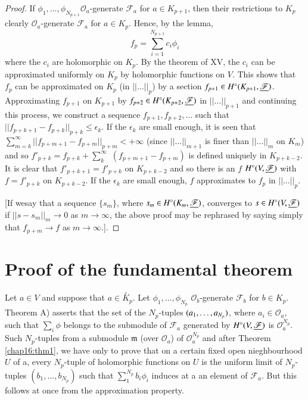 \begin{proof}
If $\phi_1, \ldots, \phi_{N_{p+1}} \mathscr{O}_a$-generate
$\mathscr{F}_a$ for $a \in K_{p+1}$, then their restrictions to $K_p$
clearly $\mathscr{O}_a$-generate $\mathscr{F}_a$ for $a \in
K_p$. Hence, by the lemma,
$$
f_p = \sum\limits^{N_{p+1}}_{i=1} c_i \phi_i
$$
where the $c_i$ are holomorphic on $K_p$. By the theorem of XV, the
$c_i$ can be approximated uniformly on $K_p$ by holomorphic functions
on $V$. This shows that $f_p$ can be approximated on $K_p$ (in $||
\ldots ||_p$) by a section $f_{p+1} \in H^\circ (K_{p+1},
\underline{\mathscr{F}})$. Approximating $f_{p+1}$ on $K_{p+1}$ by $f_{p+2}
\in H^\circ (K_{p+2}, \underline{\mathscr{F}})$ in $||\ldots ||_{p+1}$ and
continuing this process, we construct a sequence $f_{p+1}, f_{p+2},
\ldots$ such that $||f_{p+k+1} - f_{p+k}||_{p+k} \leq \epsilon_k$. If the
$\epsilon_k$ are small enough, it is seen that
$\sum\limits^\infty_{m=k}||f_{p+m+1} - f_{p+m}||_{p+m} < + \infty$
(since $||\ldots ||_{m+1}$ is finer than $||\ldots ||_m$ on $K_m$) and
so $f'_{p+k} = f_{p+k} + \sum\limits^\infty_{k}$ $(f_{p+m+1} -
f_{p+m})$ is defined uniquely in $K_{p+k-2}$. It is clear that
$f'_{p+k+1} = f'_{p+k}$ on $K_{p+k-2}$ and so there is an $f$ $H^\circ
(V, \underline{\mathscr{F}})$ with $f = f'_{p+k}$ on $K_{p+k-2}$. If the
$\epsilon_k$ are small enough, $f$ approximates to $f_p$ in $|| \ldots
||_p$. 

[If we\pageoriginale say that a sequence $\{s_m\}$, where $s_m \in
  H^\circ (K_m, \underline{\mathscr{F}})$, converges to $s \in H^\circ (
V, \underline{\mathscr{F}})$ if $|| s- s_m||_m \to 0$ as $m \to \infty$, the
above proof may be rephrased by saying simply that $f_{p+m} \to f$ as
$m \to \infty$.].
\end{proof}

\section{Proof of the fundamental theorem}\label{chap16:sec3}

\medskip
{}

Let $a \in V$ and suppose that $a \in \overset{\circ}{K}_p$. Let
$\phi_1, \ldots , \phi_{N_p}$ $\mathscr{O}_b$-generate $\mathscr{F}_b$
for $b \in K_p$. Theorem A) asserts that the set of the $N_p$-tuples
$(a_1, \ldots,\break a_{N_p})$, where $a_i \in \mathscr{O}_a$, such that
$\sum_i \phi$ belongs to the submodule of $\mathscr{F}_a$ generated
by $H^\circ (V, \underline{\mathscr{F}})$ is $\mathscr{O}^{N_p}_a$. Such
$N_p$-tuples from a submodule $\mathfrak{m}$ (over $\mathscr{O}_a$) of
$\mathscr{O}^{N_p}_a$ and after Theorem \ref{chap16:thm1}, we have
only to prove that 
on a certain fixed open nieghbourhood $U$ of a, every $N_p$-tuple of
holomorphic functions on $U$ is the uniform limit of $N_p$-tuples
$(b_1, \ldots, b_{N_p})$ such that $\sum\limits^{N_p}_1 b_i \phi_i$
induces at a an element of $\mathscr{F}_a$. But this follows at once
from the approximation property.

